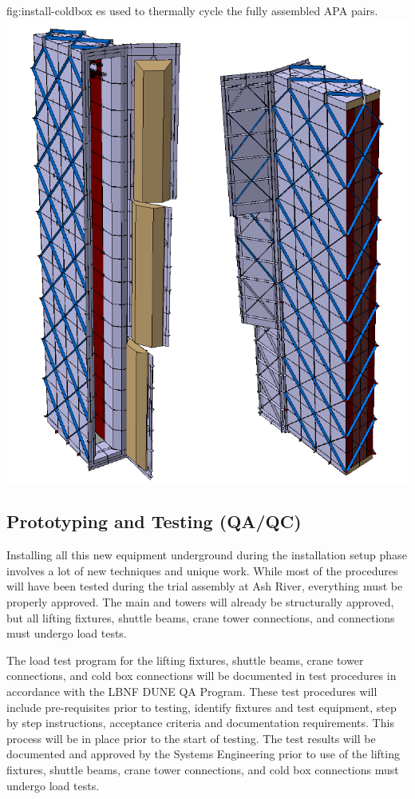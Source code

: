 \begin{dunefigure}{fig:install-coldbox}
  {\coldbox{}es used to thermally cycle the fully assembled APA pairs. }
\includegraphics[width=.5\textwidth]{graphics/install-coldbox.pdf}
\end{dunefigure}






\subsection{Prototyping and Testing (QA/QC)}
\label{sec:fdsp-tc-infr-qaqc}


Installing all this new equipment underground during the installation setup phase involves a lot of new techniques  and unique work. While most of the procedures will have been tested during the trial assembly at Ash River, everything must be properly approved. The main  and  towers will already be structurally approved, but all lifting fixtures, shuttle beams, crane tower connections, and \coldbox connections must undergo load tests. 

The load test program for the lifting fixtures, shuttle beams, crane tower connections, and cold box connections will be documented in test procedures in accordance with the LBNF DUNE QA Program.  
These test procedures will include pre-requisites prior to testing, identify fixtures and test equipment, step by step instructions, acceptance criteria and documentation requirements. 
This process will be in place prior to the start of testing. 
The test results will be documented and approved by the Systems Engineering prior to use of the lifting fixtures, shuttle beams, crane tower connections, and cold box connections must undergo load tests.

